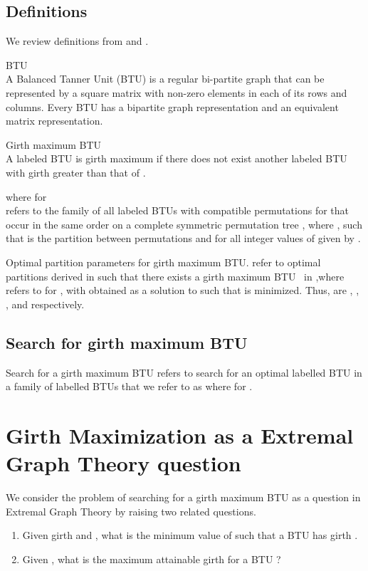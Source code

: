 \documentclass{llncs}
\begin{document}
\subsection{Definitions}
We review definitions from   and   .

\begin{definition}  BTU \\
A  Balanced Tanner Unit (BTU) is a regular bi-partite graph that can be represented by a  square matrix with  non-zero elements in each of its rows and columns. Every  BTU has a bipartite graph representation and an equivalent matrix representation.
\end{definition}

\begin{definition} {Girth maximum  BTU} \\
{A labeled   BTU   is girth maximum if there does not exist another labeled   BTU  with girth greater than that of  .}
\end{definition}

\begin{definition}  where  for    \\
  refers to the family of all labeled  BTUs with compatible permutations   for   that occur in the same order on a complete  symmetric permutation tree ,   where   , such that    is the partition between permutations   and    for all integer values of    given by   .
\end{definition}
\begin{definition} {Optimal partition parameters for girth maximum  BTU}.
 refer to optimal partitions derived in  such that there exists a girth maximum  BTU \ in  ,where  refers to  for , with  obtained as a solution to  such that  is minimized. Thus,    are  ,  , ,  and  respectively.
\end{definition}

\subsection{Search for girth maximum  BTU }
Search for a girth maximum  BTU refers to search for an optimal labelled   BTU in a family of labelled BTUs that we refer to as  
 where  for  . 

\section {Girth Maximization as a Extremal Graph Theory question}

We consider the problem of searching for a girth maximum  BTU as a question in Extremal Graph Theory by raising two related questions.
\begin{enumerate}
\item Given girth  and   , what is the minimum value of   such that a  BTU has girth   .
\item Given  , what is the maximum attainable girth for a  BTU ?
\end{enumerate}
\end{document}
